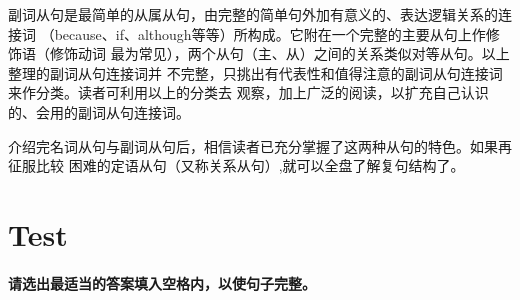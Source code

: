 副词从句是最简单的从属从句，由完整的简单句外加有意义的、表达逻辑关系的连接词
（because、if、although等等）所构成。它附在一个完整的主要从句上作修饰语（修饰动词
最为常见），两个从句（主、从）之间的关系类似对等从句。以上整理的副词从句连接词并
不完整，只挑出有代表性和值得注意的副词从句连接词来作分类。读者可利用以上的分类去
观察，加上广泛的阅读，以扩充自己认识的、会用的副词从句连接词。

介绍完名词从句与副词从句后，相信读者已充分掌握了这两种从句的特色。如果再征服比较
困难的定语从句（又称关系从句）,就可以全盘了解复句结构了。

\section{Test}

\paragraph{请选出最适当的答案填入空格内，以使句子完整。}

